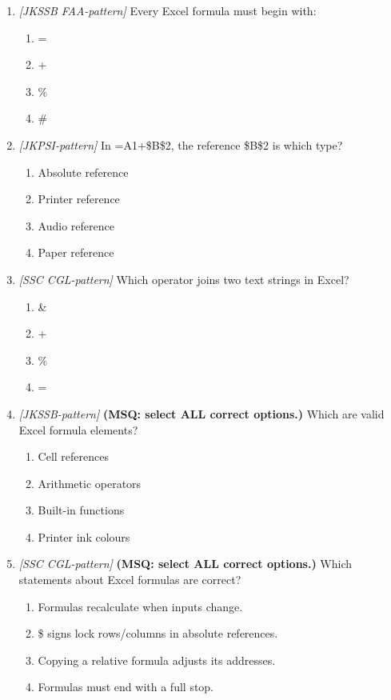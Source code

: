\documentclass[11pt]{article}
\begin{document}
\begin{enumerate}[label=\textbf{Q\arabic*.}, leftmargin=*]
\item \textit{[JKSSB FAA-pattern]} Every Excel formula must begin with:
  \begin{enumerate}[label=\Alph*.]
    \item =
    \item +
    \item \%
    \item \#
  \end{enumerate}
\item \textit{[JKPSI-pattern]} In =A1+\$B\$2, the reference \$B\$2 is which type?
  \begin{enumerate}[label=\Alph*.]
    \item Absolute reference
    \item Printer reference
    \item Audio reference
    \item Paper reference
  \end{enumerate}
\item \textit{[SSC CGL-pattern]} Which operator joins two text strings in Excel?
  \begin{enumerate}[label=\Alph*.]
    \item \&
    \item +
    \item \%
    \item =
  \end{enumerate}
\item \textit{[JKSSB-pattern]} \textbf{(MSQ: select ALL correct options.)} Which are valid Excel formula elements?
  \begin{enumerate}[label=\Alph*.]
    \item Cell references
    \item Arithmetic operators
    \item Built-in functions
    \item Printer ink colours
  \end{enumerate}
\item \textit{[SSC CGL-pattern]} \textbf{(MSQ: select ALL correct options.)} Which statements about Excel formulas are correct?
  \begin{enumerate}[label=\Alph*.]
    \item Formulas recalculate when inputs change.
    \item \$ signs lock rows/columns in absolute references.
    \item Copying a relative formula adjusts its addresses.
    \item Formulas must end with a full stop.
  \end{enumerate}
\end{enumerate}
\def\JKSSBLessonID{25}\def\JKSSBAnswers{0}
\end{document}
